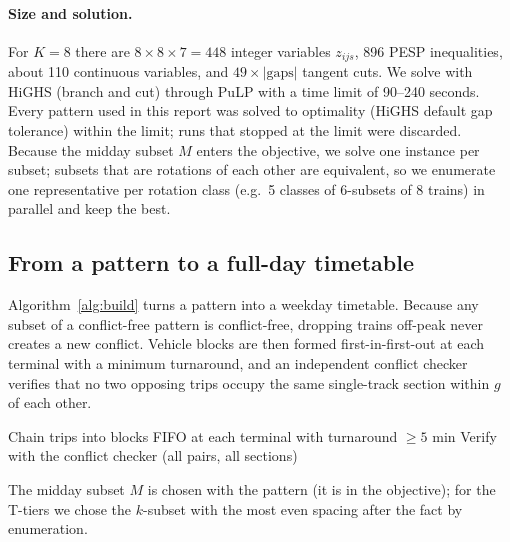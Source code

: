 \documentclass[11pt]{article}
\begin{document}
\paragraph{Size and solution.} For $K=8$ there are $8\times8\times7=448$ integer variables $z_{ijs}$, 896 PESP inequalities, about 110 continuous variables, and $49\times|\text{gaps}|$ tangent cuts. We solve with HiGHS (branch and cut) through PuLP with a time limit of 90--240 seconds. Every pattern used in this report was solved to optimality (HiGHS default gap tolerance) within the limit; runs that stopped at the limit were discarded. Because the midday subset $M$ enters the objective, we solve one instance per subset; subsets that are rotations of each other are equivalent, so we enumerate one representative per rotation class (e.g.\ 5 classes of 6-subsets of 8 trains) in parallel and keep the best.

\subsection{From a pattern to a full-day timetable}\label{sec:build}
Algorithm~\ref{alg:build} turns a pattern into a weekday timetable. Because any subset of a conflict-free pattern is conflict-free, dropping trains off-peak never creates a new conflict. Vehicle blocks are then formed first-in-first-out at each terminal with a minimum turnaround, and an independent conflict checker verifies that no two opposing trips occupy the same single-track section within $g$ of each other.

\begin{algorithm}[ht]
\caption{Build a weekday timetable from pattern $(a,b,w)$}\label{alg:build}
Chain trips into blocks FIFO at each terminal with turnaround $\ge 5$ min\;
Verify with the conflict checker (all pairs, all sections)\;
\end{algorithm}

The midday subset $M$ is chosen with the pattern (it is in the objective); for the T-tiers we chose the $k$-subset with the most even spacing after the fact by enumeration.
\end{document}
